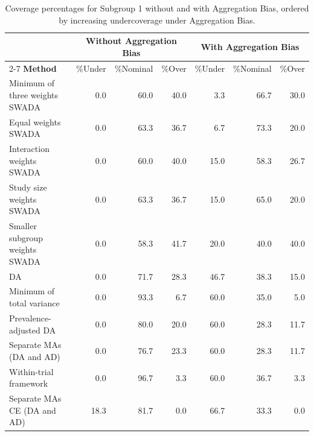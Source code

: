 \begin{table}[ht]
\centering
\caption{Coverage percentages for Subgroup 1 without and with Aggregation Bias, ordered by increasing undercoverage under Aggregation Bias.}
\begin{tabular}{l|rrr|rrr}
\hline
 & \multicolumn{3}{c|}{\textbf{Without Aggregation Bias}} & \multicolumn{3}{c}{\textbf{With Aggregation Bias}} \\
\cline{2-7}
\textbf{Method} & \%Under & \%Nominal & \%Over & \%Under & \%Nominal & \%Over \\
\hline

 Minimum of three weights SWADA & 0.0 & 60.0 & 40.0 & 3.3 & 66.7 & 30.0 \\ 
  Equal weights SWADA & 0.0 & 63.3 & 36.7 & 6.7 & 73.3 & 20.0 \\ 
  Interaction weights SWADA & 0.0 & 60.0 & 40.0 & 15.0 & 58.3 & 26.7 \\ 
  Study size weights SWADA & 0.0 & 63.3 & 36.7 & 15.0 & 65.0 & 20.0 \\ 
  Smaller subgroup weights SWADA & 0.0 & 58.3 & 41.7 & 20.0 & 40.0 & 40.0 \\ 
  DA & 0.0 & 71.7 & 28.3 & 46.7 & 38.3 & 15.0 \\ 
  Minimum of total variance & 0.0 & 93.3 & 6.7 & 60.0 & 35.0 & 5.0 \\ 
  Prevalence-adjusted DA & 0.0 & 80.0 & 20.0 & 60.0 & 28.3 & 11.7 \\ 
  Separate MAs (DA and AD) & 0.0 & 76.7 & 23.3 & 60.0 & 28.3 & 11.7 \\ 
  Within-trial framework & 0.0 & 96.7 & 3.3 & 60.0 & 36.7 & 3.3 \\ 
  Separate MAs CE (DA and AD) & 18.3 & 81.7 & 0.0 & 66.7 & 33.3 & 0.0 \\ 
  
\hline
\end{tabular}
\end{table}
